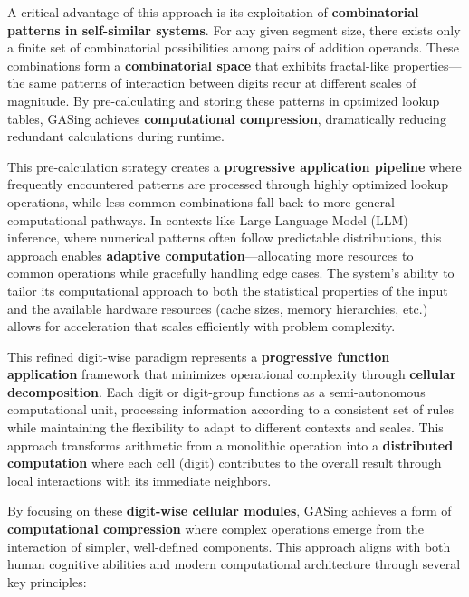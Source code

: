\documentclass[11pt,a4paper]{article}
\begin{document}
A critical advantage of this approach is its exploitation of \textbf{combinatorial patterns in self-similar systems}. For any given segment size, there exists only a finite set of combinatorial possibilities among pairs of addition operands. These combinations form a \textbf{combinatorial space} that exhibits fractal-like properties—the same patterns of interaction between digits recur at different scales of magnitude. By pre-calculating and storing these patterns in optimized lookup tables, GASing achieves \textbf{computational compression}, dramatically reducing redundant calculations during runtime.

This pre-calculation strategy creates a \textbf{progressive application pipeline} where frequently encountered patterns are processed through highly optimized lookup operations, while less common combinations fall back to more general computational pathways. In contexts like Large Language Model (LLM) inference, where numerical patterns often follow predictable distributions, this approach enables \textbf{adaptive computation}—allocating more resources to common operations while gracefully handling edge cases. The system's ability to tailor its computational approach to both the statistical properties of the input and the available hardware resources (cache sizes, memory hierarchies, etc.) allows for acceleration that scales efficiently with problem complexity.

This refined digit-wise paradigm represents a \textbf{progressive function application} framework that minimizes operational complexity through \textbf{cellular decomposition}. Each digit or digit-group functions as a semi-autonomous computational unit, processing information according to a consistent set of rules while maintaining the flexibility to adapt to different contexts and scales. This approach transforms arithmetic from a monolithic operation into a \textbf{distributed computation} where each cell (digit) contributes to the overall result through local interactions with its immediate neighbors.

By focusing on these \textbf{digit-wise cellular modules}, GASing achieves a form of \textbf{computational compression} where complex operations emerge from the interaction of simpler, well-defined components. This approach aligns with both human cognitive abilities and modern computational architecture through several key principles:
\end{document}
